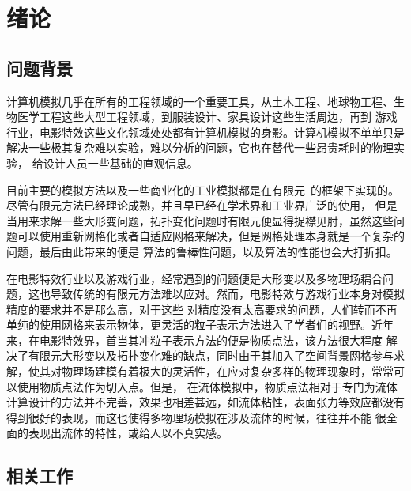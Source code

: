 
\chapter{绪论}
\label{chap_int}
\section{问题背景}
计算机模拟几乎在所有的工程领域的一个重要工具，从土木工程、地球物工程、生物医学工程这些大型工程领域，到服装设计、家具设计这些生活周边，再到
游戏行业，电影特效这些文化领域处处都有计算机模拟的身影。计算机模拟不单单只是解决一些极其复杂难以实验，难以分析的问题，它也在替代一些昂贵耗时的物理实验，
给设计人员一些基础的直观信息。

目前主要的模拟方法以及一些商业化的工业模拟都是在有限元~\cite{1942Variational}的框架下实现的。尽管有限元方法已经理论成熟，并且早已经在学术界和工业界广泛的使用，
但是当用来求解一些大形变问题，拓扑变化问题时有限元便显得捉襟见肘，虽然这些问题可以使用重新网格化或者自适应网格来解决，但是网格处理本身就是一个复杂的问题，最后由此带来的便是
算法的鲁棒性问题，以及算法的性能也会大打折扣。

在电影特效行业以及游戏行业，经常遇到的问题便是大形变以及多物理场耦合问题，这也导致传统的有限元方法难以应对。然而，电影特效与游戏行业本身对模拟精度的要求并不是那么高，对于这些
对精度没有太高要求的问题，人们转而不再单纯的使用网格来表示物体，更灵活的粒子表示方法进入了学者们的视野。近年来，在电影特效界，首当其冲粒子表示方法的便是物质点法，该方法很大程度
解决了有限元大形变以及拓扑变化难的缺点，同时由于其加入了空间背景网格参与求解，使其对物理场建模有着极大的灵活性，在应对复杂多样的物理现象时，常常可以使用物质点法作为切入点。但是，
在流体模拟中，物质点法相对于专门为流体计算设计的方法并不完善，效果也相差甚远，如流体粘性，表面张力等效应都没有得到很好的表现，而这也使得多物理场模拟在涉及流体的时候，往往并不能
很全面的表现出流体的特性，或给人以不真实感。
\section{相关工作}
